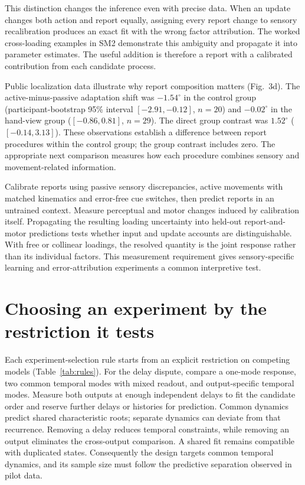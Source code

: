 \documentclass[11pt,a4paper]{article}
\begin{document}
This distinction changes the inference even with precise data. When an update changes both action and report equally, assigning every report change to sensory recalibration produces an exact fit with the wrong factor attribution. The worked cross-loading examples in SM2 demonstrate this ambiguity and propagate it into parameter estimates. The useful addition is therefore a report with a calibrated contribution from each candidate process.

Public localization data illustrate why report composition matters (Fig.~3d). The active-minus-passive adaptation shift was $-1.54^\circ$ in the control group (participant-bootstrap 95\% interval $[-2.91,-0.12]$, $n=20$) and $-0.02^\circ$ in the hand-view group ($[-0.86,0.81]$, $n=29$). The direct group contrast was $1.52^\circ$ ($[-0.14,3.13]$). These observations establish a difference between report procedures within the control group; the group contrast includes zero. The appropriate next comparison measures how each procedure combines sensory and movement-related information. \cite{external2020}

Calibrate reports using passive sensory discrepancies, active movements with matched kinematics and error-free cue switches, then predict reports in an untrained context. Measure perceptual and motor changes induced by calibration itself. Propagating the resulting loading uncertainty into held-out report-and-motor predictions tests whether input and update accounts are distinguishable. With free or collinear loadings, the resolved quantity is the joint response rather than its individual factors. This measurement requirement gives sensory-specific learning and error-attribution experiments a common interpretive test.

\section{Choosing an experiment by the restriction it tests}
Each experiment-selection rule starts from an explicit restriction on competing models (Table~\ref{tab:rules}). For the delay dispute, compare a one-mode response, two common temporal modes with mixed readout, and output-specific temporal modes. Measure both outputs at enough independent delays to fit the candidate order and reserve further delays or histories for prediction. Common dynamics predict shared characteristic roots; separate dynamics can deviate from that recurrence. Removing a delay reduces temporal constraints, while removing an output eliminates the cross-output comparison. A shared fit remains compatible with duplicated states. Consequently the design targets common temporal dynamics, and its sample size must follow the predictive separation observed in pilot data.
\end{document}

